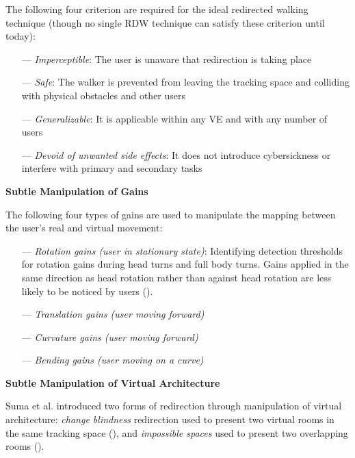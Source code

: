 \documentclass[12pt]{article}
\begin{document}
\vspace{2.0em}

The following four criterion are required for the ideal redirected walking technique (though no single RDW technique can satisfy these criterion until today):

\begin{itemize}[noitemsep]
    \item[---] \emph{Imperceptible}: The user is unaware that redirection is taking place
    \item[---] \emph{Safe}: The walker is prevented from leaving the tracking space and colliding with physical obstacles and other users
    \item[---] \emph{Generalizable}: It is applicable within any VE and with any number of users
    \item[---] \emph{Devoid of unwanted side effects}: It does not introduce cybersickness or interfere with primary and secondary tasks
\end{itemize}

\begin{center}\textbf{Subtle Manipulation of Gains}\end{center}

The following four types of gains are used to manipulate the mapping between the user's real and virtual movement:

\begin{itemize}[noitemsep]
    \item[---] \emph{Rotation gains (user in stationary state)}: Identifying detection thresholds for rotation gains during head turns and full body turns. Gains applied in the same direction as head rotation rather than against head rotation are less likely to be noticed by users (\cite{jerald2008sensitivity}).
    \item[---] \emph{Translation gains (user moving forward)}
    \item[---] \emph{Curvature gains (user moving forward)}
    \item[---] \emph{Bending gains (user moving on a curve)}
\end{itemize}

\begin{center}\textbf{Subtle Manipulation of Virtual Architecture}\end{center}

Suma et al. introduced two forms of redirection through manipulation of virtual architecture: \emph{change blindness} redirection used to present two virtual rooms in the same tracking space (\cite{suma2011leveraging}), and \emph{impossible spaces} used to present two overlapping rooms (\cite{suma2012impossible}).
\end{document}
